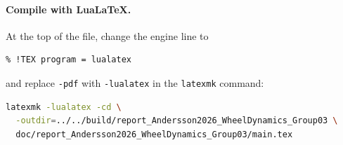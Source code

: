\documentclass[10pt,a4paper,twocolumn]{article}
\begin{document}
\paragraph{Compile with LuaLaTeX.}
At the top of the file, change the engine line to
\begin{lstlisting}
% !TEX program = lualatex
\end{lstlisting}
and replace \texttt{-pdf} with \texttt{-lualatex} in the \texttt{latexmk} command:
\begin{lstlisting}[language=bash]
latexmk -lualatex -cd \
  -outdir=../../build/report_Andersson2026_WheelDynamics_Group03 \
  doc/report_Andersson2026_WheelDynamics_Group03/main.tex
\end{lstlisting}
\end{document}
